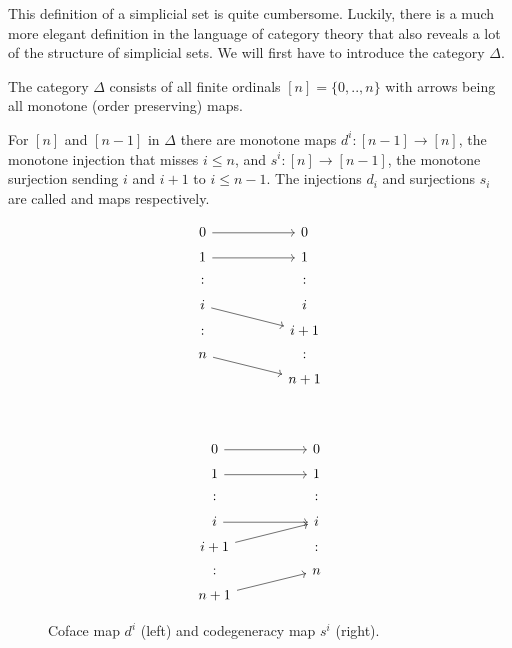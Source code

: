 \documentclass[../../main.tex]{subfiles}
\begin{document}
    This definition of a simplicial set is quite cumbersome. Luckily, there is a much more elegant definition in the language of category theory that also reveals a lot of the structure of simplicial sets. We will first have to introduce the category $\Delta$.

    \begin{definition}
        The category $\Delta$ consists of all finite ordinals $[n] = \{0, .., n\}$ with arrows being all monotone (order preserving) maps.
    \end{definition}

    For $[n]$ and $[n-1]$ in $\Delta$ there are monotone maps $d^i: [n-1] \to [n]$, the monotone injection that misses $i \leq n$, and $s^i: [n] \to [n-1]$, the monotone surjection sending $i$ and $i+1$ to $i \leq n-1$. The injections $d_i$ and surjections $s_i$ are called  and  maps respectively. 

    \begin{figure}[H]
        \begin{subfigure}[b]{0.45\textwidth}
            \[
                \begin{tikzcd}[row sep = 1ex, column sep = 5em]
                    0  \arrow[r] &  0 \\
                    1  \arrow[r] &  1 \\
                    : & : \\
                    i \arrow[dr] & i\\
                    : & i+1\\
                    n \arrow[dr] & :\\
                    & n+1
                \end{tikzcd}
          \]
        \end{subfigure}
        ~
        \begin{subfigure}[b]{0.45\textwidth}
            \[
                \begin{tikzcd}[row sep = 1ex, column sep = 5em]
                    0  \arrow[r] &  0 \\
                    1  \arrow[r] &  1 \\
                    : & : \\
                    i \arrow[r] &  i\\
                    i + 1 \arrow[ur] & :\\
                    : & n\\
                    n + 1 \arrow[ur] 
                \end{tikzcd}
          \]
        \end{subfigure}
        \caption{Coface map $d^i$ (left) and codegeneracy map $s^i$ (right).}
    \end{figure}
\end{document}
